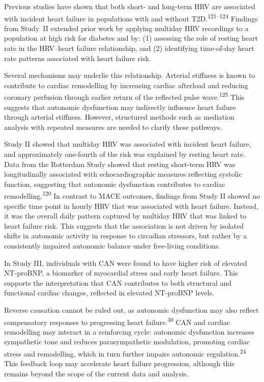 \documentclass[
  letterpaper,
  headsepline=true,
  open=any]{scrbook}
\begin{document}
Previous studies have shown that both short- and long-term HRV are
associated with incident heart failure in populations with and without
T2D.\textsuperscript{121--124} Findings from Study \,II extended prior
work by applying multiday HRV recordings to a population at high risk
for diabetes and by: (1) assessing the role of resting heart rate in the
HRV--heart failure relationship, and (2) identifying time-of-day heart
rate patterns associated with heart failure risk.

Several mechanisms may underlie this relationship. Arterial stiffness is
known to contribute to cardiac remodelling by increasing cardiac
afterload and reducing coronary perfusion through earlier return of the
reflected pulse wave.\textsuperscript{125} This suggests that autonomic
dysfunction may indirectly influence heart failure through arterial
stiffness. However, structured methods such as mediation analysis with
repeated measures are needed to clarify these pathways.

Study II showed that multiday HRV was associated with incident heart
failure, and approximately one-fourth of the risk was explained by
resting heart rate. Data from the Rotterdam Study showed that resting
short-term HRV was longitudinally associated with echocardiographic
measures reflecting systolic function, suggesting that autonomic
dysfunction contributes to cardiac remodelling.\textsuperscript{120} In
contrast to MACE outcomes, findings from Study II showed no specific
time point in hourly HRV that was associated with heart failure.
Instead, it was the overall daily pattern captured by multiday HRV that
was linked to heart failure risk. This suggests that the association is
not driven by isolated shifts in autonomic activity in response to
circadian stressors, but rather by a consistently impaired autonomic
balance under free-living conditions.

In Study III, individuals with CAN were found to have higher risk of
elevated NT-proBNP, a biomarker of myocardial stress and early heart
failure. This supports the interpretation that CAN contributes to both
structural and functional cardiac changes, reflected in elevated
NT-proBNP levels.

Reverse causation cannot be ruled out, as autonomic dysfunction may also
reflect compensatory responses to progressing heart
failure.\textsuperscript{30} CAN and cardiac remodelling may interact in
a reinforcing cycle: autonomic dysfunction increases sympathetic tone
and reduces parasympathetic modulation, promoting cardiac stress and
remodelling, which in turn further impairs autonomic
regulation.\textsuperscript{24} This feedback loop may accelerate heart
failure progression, although this remains beyond the scope of the
current data and analysis.
\end{document}
